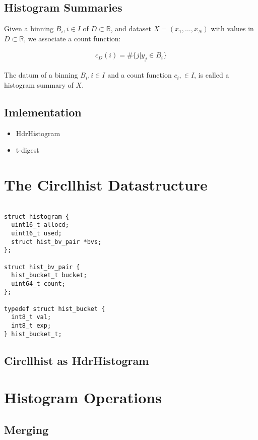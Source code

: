 \documentclass{article}
\theoremstyle{plain}
\theoremstyle{remark}
\newcommand{\IR}{\mathbb{R}}
\begin{document}
\subsection{Histogram Summaries}
Given a binning $B_i, i\in I$ of $D \subset \IR$, and  dataset $X=(x_1,\dots, x_N) $ with values in
$D \subset \IR$, we associate a count function:

\begin{align*} c_D(i) = \# \{ j | y_j \in B_i \} \end{align*}

The datum of a binning $B_i,i\in I$ and a count function $c_i,\in I$, is called a histogram summary of $X$.

\subsection{Imlementation}

\begin{itemize}
\item HdrHistogram
\item t-digest
\end{itemize}

\section{The Circllhist Datastructure}
\begin{verbatim}

struct histogram {
  uint16_t allocd;
  uint16_t used;
  struct hist_bv_pair *bvs;
};

struct hist_bv_pair {
  hist_bucket_t bucket;
  uint64_t count;
};

typedef struct hist_bucket {
  int8_t val;
  int8_t exp;
} hist_bucket_t;
\end{verbatim}

\subsection{Circllhist as HdrHistogram}

\section{Histogram Operations}

\subsection{Merging}
\end{document}
